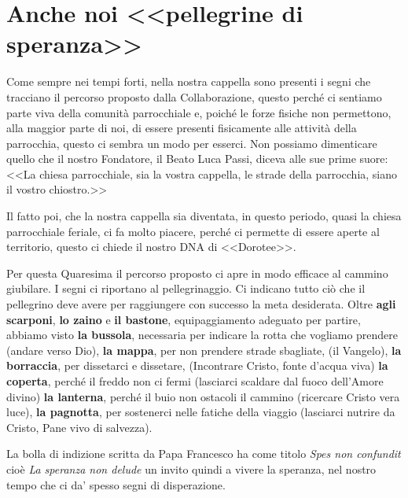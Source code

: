\section{Anche noi <<pellegrine di speranza>>}

Come sempre nei tempi forti, nella nostra cappella sono presenti i segni che tracciano il percorso proposto dalla Collaborazione, questo perché ci sentiamo parte viva della comunità parrocchiale e, poiché le forze fisiche non permettono, alla maggior parte di noi, di essere presenti fisicamente alle attività della parrocchia, questo ci sembra un modo per esserci. Non possiamo dimenticare quello che il nostro Fondatore, il Beato Luca Passi, diceva alle sue prime suore: <<La chiesa parrocchiale, sia la vostra cappella, le strade della parrocchia, siano il vostro chiostro.>>


Il fatto poi, che la nostra cappella sia diventata, in questo periodo, quasi la chiesa parrocchiale feriale, ci fa molto piacere, perché ci permette di essere aperte al territorio, questo ci chiede il nostro DNA di <<Dorotee>>.

Per questa Quaresima il percorso proposto ci apre in modo efficace al cammino giubilare. I segni ci riportano al pellegrinaggio. Ci indicano tutto ciò che il pellegrino deve avere per raggiungere con successo la meta desiderata. Oltre \textbf{agli scarponi}, \textbf{lo zaino} e \textbf{il bastone}, equipaggiamento adeguato per partire, abbiamo visto \textbf{la bussola}, necessaria per indicare la rotta che vogliamo prendere (andare verso Dio), \textbf{la mappa}, per non prendere strade sbagliate, (il Vangelo), \textbf{la borraccia}, per dissetarci e dissetare, (Incontrare Cristo, fonte d'acqua viva) \textbf{la coperta}, perché il freddo non ci fermi (lasciarci scaldare dal fuoco dell'Amore divino) \textbf{la lanterna}, perché il buio non ostacoli il cammino (ricercare Cristo vera luce), \textbf{la pagnotta}, per sostenerci nelle fatiche della viaggio (lasciarci nutrire da Cristo, Pane vivo di salvezza).

La bolla di indizione scritta da Papa Francesco ha come titolo \textit{Spes non confundit} cioè \textit{La speranza non delude} un invito quindi a vivere la speranza, nel nostro tempo che ci da' spesso segni di disperazione.

